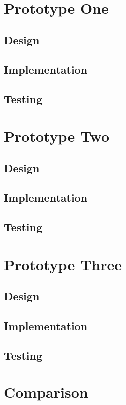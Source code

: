 \section{Prototype One}
\subsection{Design}
\subsection{Implementation}
\subsection{Testing}


\section{Prototype Two}
\subsection{Design}
\subsection{Implementation}
\subsection{Testing}


\section{Prototype Three}
\subsection{Design}
\subsection{Implementation}
\subsection{Testing}


\section{Comparison}
